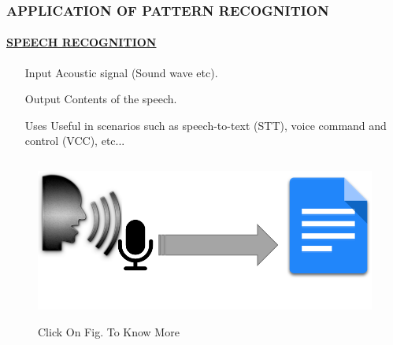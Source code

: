 \documentclass{beamer}
\begin{document}
\begin{frame}

\frametitle{APPLICATION OF PATTERN RECOGNITION}\pause
\framesubtitle{\underline{SPEECH RECOGNITION }}\pause

\begin{itemize}
 \item[Input] Acoustic signal (Sound wave etc).\pause
 \item[Output] Contents of the speech.\pause
 \item[Uses] Useful in scenarios such as speech-to-text (STT), voice command and control (VCC), etc...\pause
 \end{itemize}
 \begin{columns}
 \begin{column}{.5\textwidth}
 \begin{figure}
\href{run:voice.mp4}{\includegraphics[width=1\textwidth]{spee.png}} 
 
\caption{Click On Fig. To Know More}
\end{figure} 
 \end{column}
 
\end{columns}
\end{frame}
\end{document}
